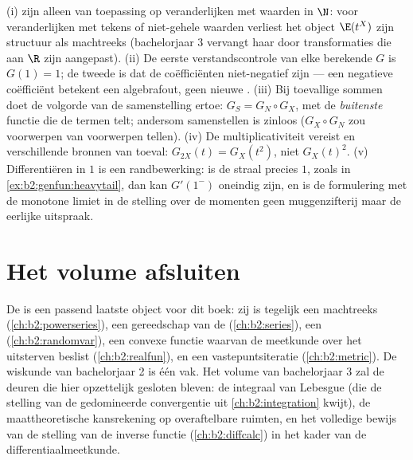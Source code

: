 \begin{remark}
(i)  zijn alleen van toepassing op
veranderlijken met waarden in $\N$: voor veranderlijken met tekens
of niet-gehele waarden verliest het object $\E(t^X)$ zijn
structuur als machtreeks (bachelorjaar 3 vervangt haar door
transformaties die aan $\R$ zijn aangepast). (ii) De eerste
verstandscontrole van elke berekende $G$ is $G(1) = 1$; de tweede
is dat de coëfficiënten niet-negatief zijn --- een negatieve
coëfficiënt betekent een algebrafout, geen nieuwe . (iii)
Bij toevallige sommen doet de volgorde van de samenstelling ertoe:
$G_S = G_N \circ G_X$, met de \emph{buitenste} functie die de
termen telt; andersom samenstellen is zinloos ($G_X \circ G_N$ zou
voorwerpen van voorwerpen tellen). (iv) De multiplicativiteit
vereist  en verschillende bronnen van toeval:
$G_{2X}(t) = G_X(t^2)$, niet $G_X(t)^2$. (v) Differentiëren in $1$
is een randbewerking: is de straal precies $1$, zoals in
\cref{ex:b2:genfun:heavytail}, dan kan $G'(1^-)$ oneindig zijn, en
is de formulering met de monotone limiet in de stelling over de
momenten geen muggenzifterij maar de eerlijke uitspraak.
\end{remark}

\section*{Het volume afsluiten}

De  is een passend laatste object voor dit boek:
zij is tegelijk een machtreeks (\cref{ch:b2:powerseries}), een
gereedschap van de  (\cref{ch:b2:series}), een
 (\cref{ch:b2:randomvar}), een convexe functie
waarvan de meetkunde over het uitsterven beslist
(\cref{ch:b2:realfun}), en een vastepuntsiteratie
(\cref{ch:b2:metric}). De wiskunde van bachelorjaar 2 is één vak.
Het volume van bachelorjaar 3 zal de deuren  die hier
opzettelijk gesloten bleven: de integraal van Lebesgue (die de
stelling van de gedomineerde convergentie uit
\cref{ch:b2:integration} kwijt), de maattheoretische kansrekening
op overaftelbare ruimten, en het volledige bewijs van de stelling
van de inverse functie (\cref{ch:b2:diffcalc}) in het kader van de
differentiaalmeetkunde.

